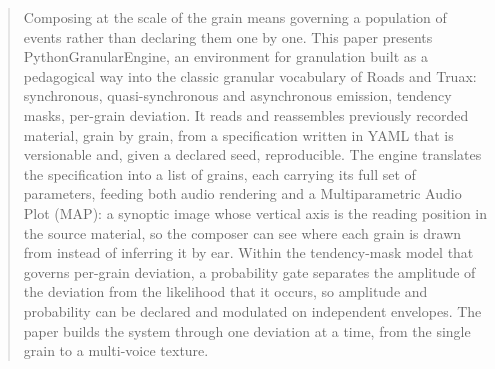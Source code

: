 \begin{abstract}
Composing at the scale of the grain means governing a population of events
rather than declaring them one by one. This paper presents
PythonGranularEngine, an environment for granulation built as a pedagogical
way into the classic granular vocabulary of Roads and Truax: synchronous,
quasi-synchronous and asynchronous emission, tendency masks, per-grain
deviation. It reads and reassembles previously recorded material, grain by
grain, from a specification written in YAML that is versionable and, given a
declared seed, reproducible. The engine translates the specification into a
list of grains, each carrying its full set of parameters, feeding both audio
rendering and a Multiparametric Audio Plot (MAP): a synoptic image whose
vertical axis is the reading position in the source material, so the composer
can see where each grain is drawn from instead of inferring it by ear. Within
the tendency-mask model that governs per-grain deviation, a probability gate
separates the amplitude of the deviation from the likelihood that it occurs,
so amplitude and probability can be declared and modulated on independent
envelopes. The paper builds the system through one deviation at a time, from
the single grain to a multi-voice texture.
\end{abstract}
